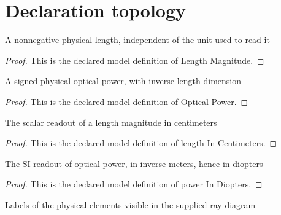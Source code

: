 \section{Declaration topology}
\begin{definition}
  \label{def:physics:phyx-mini-0129:phyxminiproblems-problemphyxmini0129-lengthmagnitude}
  A nonnegative physical length, independent of the unit used to read it
\end{definition}
\begin{proof}
  This is the declared model definition of Length Magnitude.
\end{proof}
\begin{definition}
  \label{def:physics:phyx-mini-0129:phyxminiproblems-problemphyxmini0129-opticalpower}
  A signed physical optical power, with inverse-length dimension
\end{definition}
\begin{proof}
  This is the declared model definition of Optical Power.
\end{proof}
\begin{definition}
  \label{def:physics:phyx-mini-0129:phyxminiproblems-problemphyxmini0129-lengthincentimeters}
  The scalar readout of a length magnitude in centimeters
\end{definition}
\begin{proof}
  This is the declared model definition of length In Centimeters.
\end{proof}
\begin{definition}
  \label{def:physics:phyx-mini-0129:phyxminiproblems-problemphyxmini0129-powerindiopters}
  The SI readout of optical power, in inverse meters, hence in diopters
\end{definition}
\begin{proof}
  This is the declared model definition of power In Diopters.
\end{proof}
\begin{definition}
  \label{def:physics:phyx-mini-0129:phyxminiproblems-problemphyxmini0129-figureelement}
  Labels of the physical elements visible in the supplied ray diagram
\end{definition}
